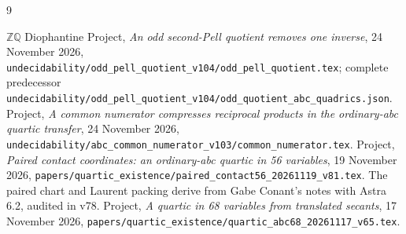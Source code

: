 \documentclass[11pt]{article}
\newcommand{\Q}{\mathbb Q}\newcommand{\Z}{\mathbb Z}
\begin{document}
\small
\begin{thebibliography}{9}\raggedright
\setlength{\itemsep}{2pt}
 \(\Z\Q\) Diophantine Project,
\emph{An odd second-Pell quotient removes one inverse}, 24 November 2026,
\nolinkurl{undecidability/odd_pell_quotient_v104/odd_pell_quotient.tex};
complete predecessor
\nolinkurl{undecidability/odd_pell_quotient_v104/odd_quotient_abc_quadrics.json}.
 Project, \emph{A common numerator compresses reciprocal
products in the ordinary-abc quartic transfer}, 24 November 2026,
\nolinkurl{undecidability/abc_common_numerator_v103/common_numerator.tex}.
 Project, \emph{Paired contact coordinates: an ordinary-abc
quartic in 56 variables}, 19 November 2026,
\nolinkurl{papers/quartic_existence/paired_contact56_20261119_v81.tex}.
The paired chart and Laurent packing derive from Gabe Conant's notes
with Astra 6.2, audited in v78.
 Project, \emph{A quartic in 68 variables from translated
secants}, 17 November 2026,
\nolinkurl{papers/quartic_existence/quartic_abc68_20261117_v65.tex}.
\end{thebibliography}
\end{document}
